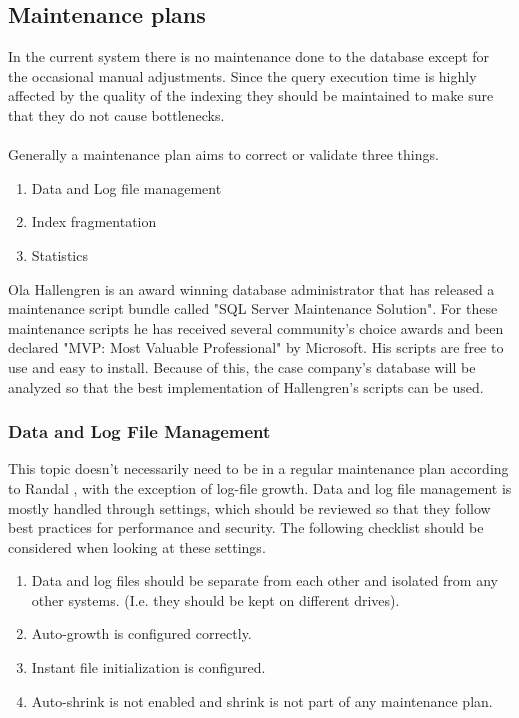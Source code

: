 \documentclass{cslthse-msc}
\begin{document}
\subsection{Maintenance plans}
In the current system there is no maintenance done to the database except for the occasional manual adjustments. Since the query execution time is highly affected by the quality of the indexing they should be maintained to make sure that they do not cause bottlenecks. \\\\
Generally a maintenance plan aims to correct or validate three things.
\begin{enumerate}
\item Data and Log file management
\item Index fragmentation
\item Statistics
\end{enumerate}

\noindent Ola Hallengren \cite{Hallengren15} is an award winning database administrator that has released a maintenance script bundle called "SQL Server Maintenance Solution". For these maintenance scripts he has received several community's choice awards and been declared "MVP: Most Valuable Professional" by Microsoft. His scripts are free to use and easy to install. Because of this, the case company's database will be analyzed so that the best implementation of Hallengren's scripts can be used.

\subsubsection{Data and Log File Management}
This topic doesn't necessarily need to be in a regular maintenance plan according to Randal \cite{Randal08}, with the exception of log-file growth. Data and log file management is mostly handled through settings, which should be reviewed so that they follow best practices for performance and security. The following checklist should be considered when looking at these settings.

\begin{enumerate}
\item Data and log files should be separate from each other and isolated from any other systems. (I.e. they should be kept on different drives).
\item Auto-growth is configured correctly.
\item Instant file initialization is configured.
\item Auto-shrink is not enabled and shrink is not part of any maintenance plan.
\end{enumerate}
\end{document}

